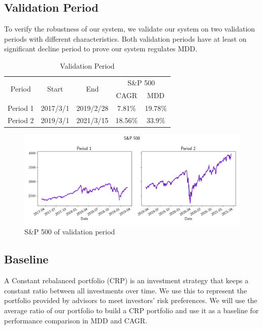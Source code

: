 \subsection{Validation Period}
To verify the robustness of our system, we validate our system on two validation periods with different characteristics. Both validation periods have at least on significant decline period to prove our system regulates MDD.
\begin{table}[htb]
    \centering
    \begin{tabular}{||c|c|c|c|c||}
    \hline \hline
    \multirow{2}{*}{Period} &
    \multirow{2}{*}{Start} &
    \multirow{2}{*}{End} &
    \multicolumn{2}{c||}{S\&P 500} \\ 
    \cline{4-5} &{} &{} & CAGR & MDD \\ \hline \hline
    Period 1 & 2017/3/1 & 2019/2/28 & 7.81\% & 19.78\% \\ \hline
    Period 2 & 2019/3/1 & 2021/3/15 & 18.56\% & 33.9\% \\    
    \hline \hline
    \end{tabular}
    \caption{Validation Period}
    \label{tab:validation_period}
\end{table}
\begin{figure}[htb]
    \centering
    \includegraphics[width=15cm]{images/sp500.png}
    \caption{S\&P 500 of validation period}
    \label{fig:my_label}
\end{figure}

\subsection{Baseline}
A Constant rebalanced portfolio (CRP) is an investment strategy that keeps a constant ratio between all investments over time. We use this to represent the portfolio provided by advisors to meet investors' risk preferences. We will use the average ratio of our portfolio to build a CRP portfolio and use it as a baseline for performance comparison in MDD and CAGR.
